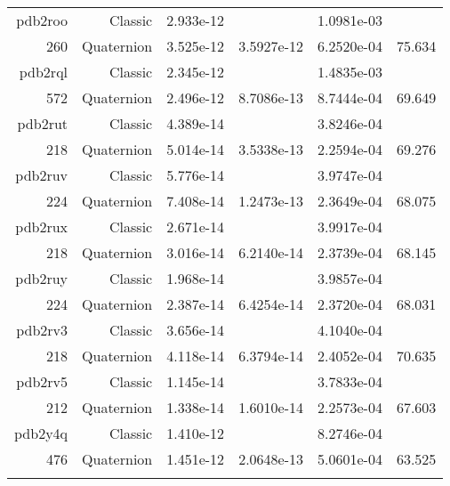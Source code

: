 \begin{xltabular}{\textwidth}{r|rS[table-format=1.3e+2]S[table-format=1.4e+2]S[table-format=1.4e+2]S[table-format=-1.3]}
pdb2roo & Classic & 2.933e-12 &  & 1.0981e-03 & \\
260 & Quaternion & 3.525e-12 & 3.5927e-12 & 6.2520e-04 & 75.634\\  \addlinespace
pdb2rql & Classic & 2.345e-12 &  & 1.4835e-03 & \\
572 & Quaternion & 2.496e-12 & 8.7086e-13 & 8.7444e-04 & 69.649\\  \addlinespace
pdb2rut & Classic & 4.389e-14 &  & 3.8246e-04 & \\
218 & Quaternion & 5.014e-14 & 3.5338e-13 & 2.2594e-04 & 69.276\\  \addlinespace
pdb2ruv & Classic & 5.776e-14 &  & 3.9747e-04 & \\
224 & Quaternion & 7.408e-14 & 1.2473e-13 & 2.3649e-04 & 68.075\\  \addlinespace
pdb2rux & Classic & 2.671e-14 &  & 3.9917e-04 & \\
218 & Quaternion & 3.016e-14 & 6.2140e-14 & 2.3739e-04 & 68.145\\  \addlinespace
pdb2ruy & Classic & 1.968e-14 &  & 3.9857e-04 & \\
224 & Quaternion & 2.387e-14 & 6.4254e-14 & 2.3720e-04 & 68.031\\  \addlinespace
pdb2rv3 & Classic & 3.656e-14 &  & 4.1040e-04 & \\
218 & Quaternion & 4.118e-14 & 6.3794e-14 & 2.4052e-04 & 70.635\\  \addlinespace
pdb2rv5 & Classic & 1.145e-14 &  & 3.7833e-04 & \\
212 & Quaternion & 1.338e-14 & 1.6010e-14 & 2.2573e-04 & 67.603\\  \addlinespace
pdb2y4q & Classic & 1.410e-12 &  & 8.2746e-04 & \\
476 & Quaternion & 1.451e-12 & 2.0648e-13 & 5.0601e-04 & 63.525\\  \addlinespace
\end{xltabular}
